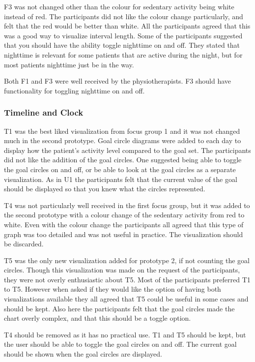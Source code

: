 F3 was not changed other than the colour for sedentary activity being white instead of red. The participants did not like the colour change particularly, and felt that the red would be better than white. All the participants agreed that this was a good way to visualize interval length. Some of the participants suggested that you should have the ability toggle nighttime on and off. They stated that nighttime is relevant for some patients that are active during the night, but for most patients nighttime just be in the way.

Both F1 and F3 were well received by the physiotherapists. F3 should have functionality for toggling nighttime on and off.

\subsubsection{Timeline and Clock}
T1 was the best liked visualization from focus group 1 and it was not changed much in the second prototype. Goal circle diagrams were added to each day to display how the patient's activity level compared to the goal set. The participants did not like the addition of the goal circles. One suggested being able to toggle the goal circles on and off, or be able to look at the goal circles as a separate visualization. As in U1 the participants felt that the current value of the goal should be displayed so that you knew what the circles represented.

T4 was not particularly well received in the first focus group, but it was added to the second prototype with a colour change of the sedentary activity from red to white. Even with the colour change the participants all agreed that this type of graph was too detailed and was not useful in practice. The visualization should be discarded.

T5 was the only new visualization added for prototype 2, if not counting the goal circles. Though this visualization was made on the request of the participants, they were not overly enthusiastic about T5. Most of the participants preferred T1 to T5. However when asked if they would like the option of having both visualizations available they all agreed that T5 could be useful in some cases and should be kept. Also here the participants felt that the goal circles made the chart overly complex, and that this should be a toggle option.

T4 should be removed as it has no practical use. T1 and T5 should be kept, but the user should be able to toggle the goal circles on and off. The current goal should be shown when the goal circles are displayed. 

